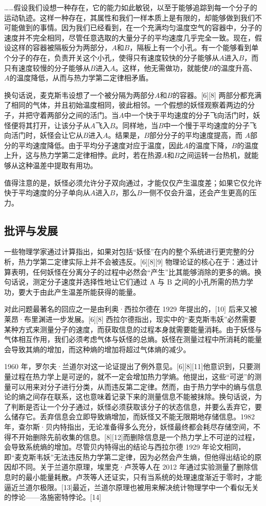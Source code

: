 ……假设我们设想一种存在，它的能力如此敏锐，以至于能够追踪到每一个分子的运动轨迹。这样一种存在，其属性和我们一样本质上是有限的，却能够做到我们不可能做到的事情。因为我们已经看到，在一个充满均匀温度空气的容器中，分子的速度并不完全相同，尽管任意选取的大量分子的平均速度几乎完全一致。现在，假设这样的容器被隔板分为两部分，$A$和$B$，隔板上有一个小孔。有一个能够看到单个分子的存在，负责开关这个小孔，使得只有速度较快的分子能够从$A$进入$B$，而只有速度较慢的分子能够从$B$进入$A$。这样，他无需做功，就能使$B$的温度升高、$A$的温度降低，从而与热力学第二定律相矛盾。

换句话说，麦克斯韦设想了一个被分隔为两部分$A$和$B$的容器。[6][8] 两部分都充满了相同的气体，并且初始温度相同，彼此相邻。一个假想的妖怪观察着两边的分子，并把守着两部分之间的活门。当$A$中一个快于平均速度的分子飞向活门时，妖怪便将其打开，让该分子从$A$飞入$B$。同样地，当$B$中一个慢于平均速度的分子飞向活门时，妖怪会让它从$B$进入$A$。结果是，$B$部分分子的平均速度提高，而 $A$部分的平均速度降低。由于平均分子速度对应于温度，因此$A$的温度下降，$B$的温度上升，这与热力学第二定律相悖。此时，若在热源$A$和$B$之间运转一台热机，就能够从这种温差中提取有用功。

值得注意的是，妖怪必须允许分子双向通过，才能仅仅产生温度差；如果它仅允许快于平均速度的分子单向从$A$进入$B$，那么$B$一侧不仅会升温，还会产生更高的压力。
\subsection{批评与发展}
一些物理学家通过计算指出，如果对包括“妖怪”在内的整个系统进行更完整的分析，热力学第二定律实际上并不会被违反。[6][8][9] 物理论证的核心在于：通过计算表明，任何妖怪在分离分子的过程中必然会“产生”比其能够消除的更多的熵。换句话说，测定分子速度并选择性地让它们通过 A 与 B 之间的小孔所需的热力学功，要大于由此产生温差所能获得的能量。

对此问题最著名的回应之一是由利奥·西拉尔德在 1929 年提出的，[10] 后来又被莱昂·布里渊进一步发展。[6][8] 西拉尔德指出，现实中的“麦克斯韦妖”必然需要某种方式来测量分子的速度，而获取信息的过程本身就需要能量消耗。由于妖怪与气体相互作用，我们必须考虑气体与妖怪的总熵。妖怪在测量过程中所消耗的能量会导致其熵的增加，而这种熵的增加将超过气体熵的减少。

1960 年，罗尔夫·兰道尔对这一论证提出了例外意见。[6][8][11]他意识到，只要测量过程在热力学上是可逆的，就不一定会增加热力学熵。他提出，这些“可逆”的测量可以用来对分子进行分类，从而违反第二定律。然而，由于热力学中的熵与信息论的熵之间存在联系，这也意味着记录下来的测量信息不能被抹除。换句话说，为了判断是否让一个分子通过，妖怪必须获取该分子的状态信息，并要么丢弃它，要么储存它。丢弃信息会立即导致熵增加，而妖怪又不能无限期地存储信息。1982 年，查尔斯·贝内特指出，无论准备得多么充分，妖怪最终都会耗尽存储空间，不得不开始删除先前收集的信息。[8][12]而删除信息是一个热力学上不可逆的过程，会导致系统熵的增加。尽管贝内特得出的结论与西拉尔德 1929 年论文相同，即“麦克斯韦妖”无法违反热力学第二定律，因为必然会产生熵，但他得出结论的原因却不同。关于兰道尔原理，埃里克·卢茨等人在 2012 年通过实验测量了删除信息时的最小能量耗散。卢茨等人还证实，只有当系统的处理速度渐近于零时，才能逼近兰道尔极限。[13]最近，兰道尔原理也被用来解决统计物理学中一个看似无关的悖论——洛施密特悖论。[14]


